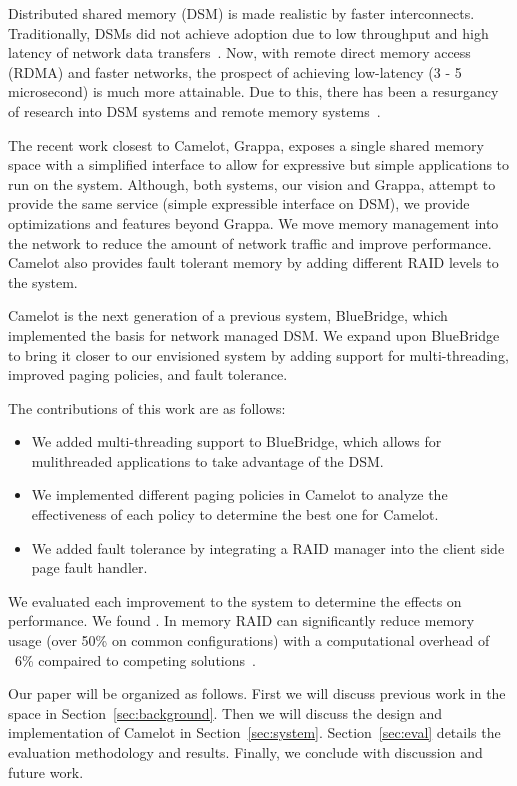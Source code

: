Distributed shared memory (DSM) is made realistic by faster interconnects.
Traditionally, DSMs did not achieve adoption due to low throughput and high
latency of network data transfers~\cite{Li1989}. Now, with remote direct memory
access (RDMA) and faster networks, the prospect of achieving low-latency (3 - 5
microsecond) is much more attainable. Due to this, there has been a resurgancy
of research into DSM systems and remote memory systems~\cite{Ongaro2011,Nelson2015,Dragojevic2014}. 

The recent work closest to Camelot, Grappa, exposes a single shared memory
space with a simplified interface to allow for expressive but simple
applications to run on the system. Although, both systems, our vision and
Grappa, attempt to provide the same service (simple expressible interface on
DSM), we provide optimizations and features beyond Grappa. We move memory
management into the network to reduce the amount of network traffic and improve
performance. Camelot also provides fault tolerant memory by adding different
RAID levels to the system. 

Camelot is the next generation of a previous system, BlueBridge, which
implemented the basis for network managed DSM. We expand upon BlueBridge to
bring it closer to our envisioned system by adding support for multi-threading,
improved paging policies, and fault tolerance.

The contributions of this work are as follows:
\begin{itemize}
	\item We added multi-threading support to BlueBridge, which allows for
	mulithreaded applications to take advantage of the DSM.
	\item We implemented different paging policies in Camelot to analyze the
	effectiveness of each policy to determine the best one for Camelot.
	\item We added fault tolerance by integrating a RAID manager into the client side page fault handler.
        
\end{itemize}

We evaluated each improvement to the system to determine the effects on
performance. We found . In memory RAID can significantly reduce memory usage
(over 50\% on common configurations) with a computational overhead of ~6\%
compaired to competing solutions~\cite{Ousterhout:2015:RSS:2818727.2806887}.

Our paper will be organized as follows. First we will discuss previous work in
the space in Section~\ref{sec:background}. Then we will discuss the design and
implementation of Camelot in Section~\ref{sec:system}. Section~\ref{sec:eval}
details the evaluation methodology and results. Finally, we conclude with
discussion and future work. 
